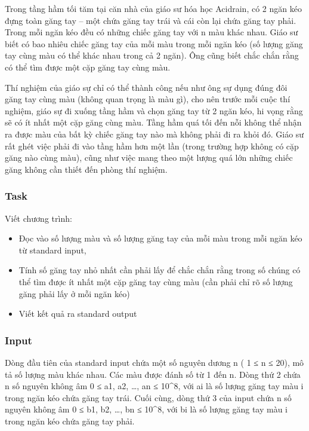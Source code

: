 







   Trong tầng hầm tối tăm tại căn nhà của giáo sư hóa học Acidrain, có 2 ngăn kéo đựng toàn găng tay – một chứa găng tay trái và cái còn lại chứa găng tay phải. Trong mỗi ngăn kéo đều có những chiếc găng tay với n màu khác nhau. Giáo sư biết có bao nhiêu chiếc găng tay của mỗi màu trong mỗi ngăn kéo (số lượng găng tay cùng màu có thể khác nhau trong cả 2 ngăn). Ông cũng biết chắc chắn rằng có thể tìm được một cặp găng tay cùng màu.  

   Thí nghiệm của giáo sự chỉ có thể thành công nếu như ông sự dụng đúng đôi găng tay cùng màu (không quan trọng là màu gì), cho nên trước mỗi cuộc thí nghiệm, giáo sự đi xuống tầng hầm và chọn găng tay từ 2 ngăn kéo, hi vọng rằng sẽ có ít nhất một cặp găng cùng màu. Tầng hầm quá tối đến nỗi không thể nhận ra được màu của bất kỳ chiếc găng tay nào mà không phải đi ra khỏi đó. Giáo sư rất ghét việc phải đi vào tầng hầm hơn một lần (trong trường hợp không có cặp găng nào cùng màu), cũng như việc mang theo một lượng quá lớn những chiếc găng không cần thiết đến phòng thí nghiệm.  

\subsubsection{   Task  }

   Viết chương trình:  
\begin{itemize}
	\item     Đọc vào số lượng màu và số lượng găng tay của mỗi màu trong mỗi ngăn kéo từ standard input,   
	\item     Tính số găng tay nhỏ nhất cần phải lấy để chắc chắn rằng trong số chúng có thể tìm được ít nhất một cặp găng tay cùng màu (cần phải chỉ rõ số lượng găng phải lấy ở mỗi ngăn kéo)   
	\item     Viết kết quả ra standard output   
\end{itemize}



\subsubsection{   Input  }

   Dòng đầu tiên của standard input chứa một số nguyên dương n ( 1 ≤ n ≤ 20), mô tả số lượng màu khác nhau. Các màu được đánh số từ 1 đến n. Dòng thứ 2 chứa n số nguyên không âm 0 ≤ a1, a2, …, an ≤ 10\textasciicircum8, với ai là số lượng găng tay màu i trong ngăn kéo chứa găng tay trái. Cuối cùng, dòng thứ 3 của input chứa n số nguyên không âm 0 ≤ b1, b2, …, bn ≤ 10\textasciicircum8, với bi là số lượng găng tay màu i trong ngăn kéo chứa găng tay phải.  

